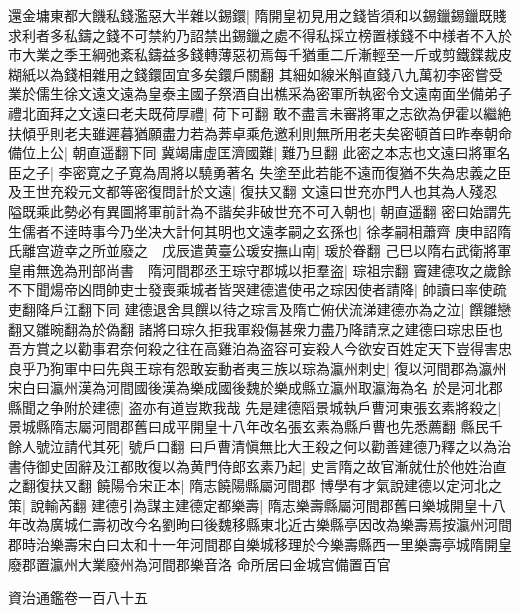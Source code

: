還金墉東都大饑私錢濫惡大半雜以錫鐶|{
	隋開皇初見用之錢皆須和以錫鑞錫鑞既賤求利者多私鑄之錢不可禁約乃詔禁出錫鑞之處不得私採立榜置様錢不中様者不入於市大業之季王綱弛紊私鑄益多錢轉薄惡初焉每千猶重二斤漸輕至一斤或剪鐵鍱裁皮糊紙以為錢相雜用之錢鐶固宜多矣鐶戶關翻}
其細如線米斛直錢八九萬初李密嘗受業於儒生徐文遠文遠為皇泰主國子祭酒自出樵采為密軍所執密令文遠南面坐備弟子禮北面拜之文遠曰老夫既荷厚禮|{
	荷下可翻}
敢不盡言未審將軍之志欲為伊霍以繼絶扶傾乎則老夫雖遲暮猶願盡力若為莾卓乘危邀利則無所用老夫矣密頓首曰昨奉朝命備位上公|{
	朝直遥翻下同}
冀竭庸虛匡濟國難|{
	難乃旦翻}
此密之本志也文遠曰將軍名臣之子|{
	李密寛之子寛為周將以驍勇著名}
失塗至此若能不遠而復猶不失為忠義之臣及王世充殺元文都等密復問計於文遠|{
	復扶又翻}
文遠曰世充亦門人也其為人殘忍隘既乘此勢必有異圖將軍前計為不諧矣非破世充不可入朝也|{
	朝直遥翻}
密曰始謂先生儒者不逹時事今乃坐决大計何其明也文遠孝嗣之玄孫也|{
	徐孝嗣相蕭齊}
庚申詔隋氏離宫遊幸之所並廢之　戊辰遣黄臺公瑗安撫山南|{
	瑗於眷翻}
己巳以隋右武衛將軍皇甫無逸為刑部尚書　隋河間郡丞王琮守郡城以拒羣盗|{
	琮祖宗翻}
竇建德攻之歲餘不下聞煬帝凶問帥吏士發喪乘城者皆哭建德遣使弔之琮因使者請降|{
	帥讀曰率使疏吏翻降戶江翻下同}
建德退舍具饌以待之琮言及隋亡俯伏流涕建德亦為之泣|{
	饌雛戀翻又雛晼翻為於偽翻}
諸將曰琮久拒我軍殺傷甚衆力盡乃降請烹之建德曰琮忠臣也吾方賞之以勸事君奈何殺之往在高雞泊為盗容可妄殺人今欲安百姓定天下豈得害忠良乎乃狥軍中曰先與王琮有怨敢妄動者夷三族以琮為瀛州刺史|{
	復以河間郡為瀛州宋白曰瀛州漢為河間國後漢為樂成國後魏於樂成縣立瀛州取瀛海為名}
於是河北郡縣聞之争附於建德|{
	盗亦有道豈欺我哉}
先是建德䧟景城執戶曹河東張玄素將殺之|{
	景城縣隋志屬河間郡舊曰成平開皇十八年改名張玄素為縣戶曹也先悉薦翻}
縣民千餘人號泣請代其死|{
	號戶口翻}
曰戶曹清愼無比大王殺之何以勸善建德乃釋之以為治書侍御史固辭及江都敗復以為黄門侍郎玄素乃起|{
	史言隋之故官漸就仕於他姓治直之翻復扶又翻}
饒陽令宋正本|{
	隋志饒陽縣屬河間郡}
博學有才氣說建德以定河北之策|{
	說輸芮翻}
建德引為謀主建德定都樂壽|{
	隋志樂壽縣屬河間郡舊曰樂城開皇十八年改為廣城仁壽初改今名劉昫曰後魏移縣東北近古樂縣亭因改為樂壽焉按瀛州河間郡時治樂壽宋白曰太和十一年河間郡自樂城移理於今樂壽縣西一里樂壽亭城隋開皇廢郡置瀛州大業廢州為河間郡樂音洛}
命所居曰金城宫備置百官

資治通鑑卷一百八十五
